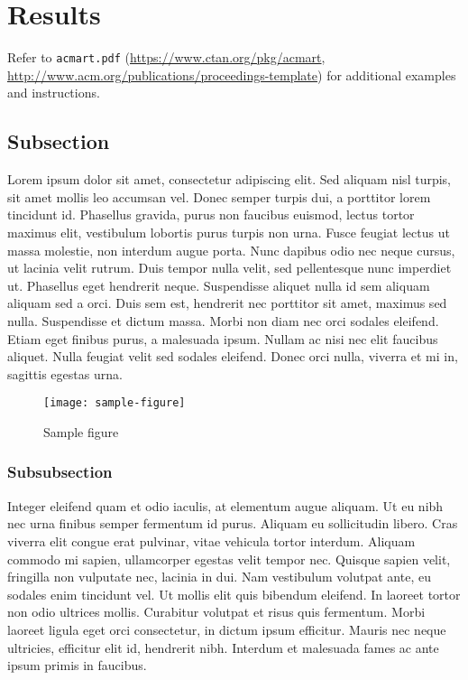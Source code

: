 \section{Results}

Refer to \verb|acmart.pdf| \cite{veytsmanlatex} (\url{https://www.ctan.org/pkg/acmart}, \url{http://www.acm.org/publications/proceedings-template}) for additional examples and instructions.

\subsection{Subsection}

Lorem ipsum dolor sit amet, consectetur adipiscing elit.
Sed aliquam nisl turpis, sit amet mollis leo accumsan vel.
Donec semper turpis dui, a porttitor lorem tincidunt id.
Phasellus gravida, purus non faucibus euismod, lectus tortor maximus elit, vestibulum lobortis purus turpis non urna.
Fusce feugiat lectus ut massa molestie, non interdum augue porta.
Nunc dapibus odio nec neque cursus, ut lacinia velit rutrum.
Duis tempor nulla velit, sed pellentesque nunc imperdiet ut.
Phasellus eget hendrerit neque.
Suspendisse aliquet nulla id sem aliquam aliquam sed a orci.
Duis sem est, hendrerit nec porttitor sit amet, maximus sed nulla.
Suspendisse et dictum massa.
Morbi non diam nec orci sodales eleifend.
Etiam eget finibus purus, a malesuada ipsum.
Nullam ac nisi nec elit faucibus aliquet.
Nulla feugiat velit sed sodales eleifend.
Donec orci nulla, viverra et mi in, sagittis egestas urna.

\begin{figure}[htbp]
  \centering
  \texttt{[image: sample-figure]}
  \caption{Sample figure}
  \label{fig4:../Figures/sample}
\end{figure}

\subsubsection{Subsubsection}

Integer eleifend quam et odio iaculis, at elementum augue aliquam.
Ut eu nibh nec urna finibus semper fermentum id purus.
Aliquam eu sollicitudin libero.
Cras viverra elit congue erat pulvinar, vitae vehicula tortor interdum.
Aliquam commodo mi sapien, ullamcorper egestas velit tempor nec.
Quisque sapien velit, fringilla non vulputate nec, lacinia in dui.
Nam vestibulum volutpat ante, eu sodales enim tincidunt vel.
Ut mollis elit quis bibendum eleifend.
In laoreet tortor non odio ultrices mollis.
Curabitur volutpat et risus quis fermentum.
Morbi laoreet ligula eget orci consectetur, in dictum ipsum efficitur.
Mauris nec neque ultricies, efficitur elit id, hendrerit nibh.
Interdum et malesuada fames ac ante ipsum primis in faucibus.

